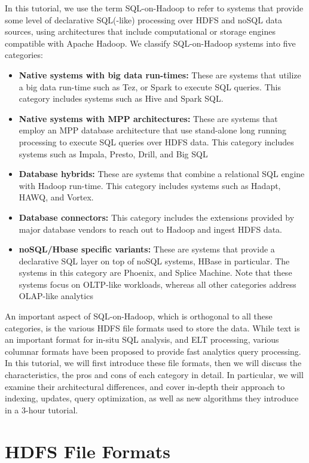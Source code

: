 \documentclass{vldb}
\begin{document}
In this tutorial, we use the term SQL-on-Hadoop to refer to systems that provide some level of declarative SQL(-like) processing over HDFS and noSQL data sources, using architectures that include computational or storage engines compatible with Apache Hadoop. We classify SQL-on-Hadoop systems into five categories:

\begin{itemize}
\item {{\bf Native systems with big data run-times:} These are systems that utilize a big data run-time such as Tez, or Spark to execute SQL queries. This category includes systems such as Hive and Spark SQL.}
\item{ {\bf Native systems with MPP architectures:} These are systems that employ an MPP database architecture that use stand-alone long running processing to execute SQL queries over HDFS data. This category includes systems such as Impala, Presto, Drill, and Big SQL}
\item{{\bf Database hybrids:} These are systems that combine a relational SQL engine with Hadoop run-time. This category includes systems such as Hadapt, HAWQ, and Vortex.}
\item{ {\bf Database connectors:} This category includes the extensions provided by major database vendors to reach out to Hadoop and ingest HDFS data. }
\item{ {\bf noSQL/Hbase specific variants:} These are systems that provide a declarative SQL layer on top of noSQL systems, HBase in particular. The systems in this category are Phoenix, and Splice Machine. Note that these systems focus on OLTP-like workloads, whereas all other categories address OLAP-like analytics}
\end{itemize}

An important aspect of SQL-on-Hadoop, which is orthogonal to all these categories, is the various HDFS file formats used to store the data. While text is an important format for in-situ SQL analysis, and ELT processing, various columnar formats have been proposed to provide fast analytics query processing. In this tutorial, we will first introduce these file formats, then we will discuss the characteristics, the pros and cons of each category in detail. In particular, we will examine their architectural differences, and cover in-depth their approach to indexing, updates, query optimization, as well as new algorithms they introduce in a 3-hour tutorial.

\section{HDFS File Formats}
\end{document}
